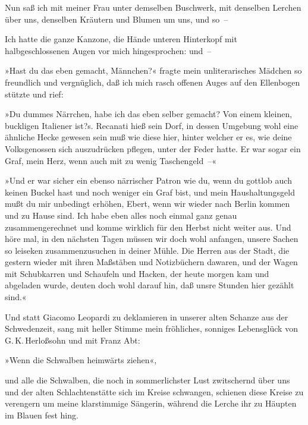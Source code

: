 Nun saß ich mit meiner Frau unter demselben Buschwerk, mit
denselben Lerchen über uns, denselben Kräutern und Blumen um uns,
und so~–

Ich hatte die ganze Kanzone, die Hände unteren Hinterkopf mit
halbgeschlossenen Augen vor mich hingesprochen: und~–

»Hast du das eben gemacht, Männchen?« fragte mein unliterarisches
Mädchen so freundlich und vergnüglich, daß ich mich rasch offenen
Auges auf den Ellenbogen stützte und rief:

»Du dummes Närrchen, habe ich das eben selber gemacht? Von einem
kleinen, buckligen Italiener ist?s. Recanati hieß sein Dorf, in
dessen Umgebung wohl eine ähnliche Hecke gewesen sein muß wie diese
hier, hinter welcher er es, wie deine Volksgenossen sich
auszudrücken pflegen, unter der Feder hatte. Er war sogar ein Graf,
mein Herz, wenn auch mit zu wenig Taschengeld~–«

»Und er war sicher ein ebenso närrischer Patron wie du, wenn du
gottlob auch keinen Buckel hast und noch weniger ein Graf bist, und
mein Haushaltungsgeld mußt du mir unbedingt erhöhen, Ebert, wenn
wir wieder nach Berlin kommen und zu Hause sind. Ich habe eben
alles noch einmal ganz genau zusammengerechnet und komme wirklich
für den Herbst nicht weiter aus. Und höre mal, in den nächsten
Tagen müssen wir doch wohl anfangen, unsere Sachen so leiseken
zusammenzusuchen in deiner Mühle. Die Herren aus der Stadt, die
gestern wieder mit ihren Maßstäben und Notizbüchern dawaren, und
der Wagen mit Schubkarren und Schaufeln und Hacken, der heute
morgen kam und abgeladen wurde, deuten doch wohl darauf hin, daß
unsre Stunden hier gezählt sind.«

Und statt Giacomo Leopardi zu deklamieren in unserer alten Schanze
aus der Schwedenzeit, sang mit heller Stimme mein fröhliches,
sonniges Lebensglück von G.\,K.\,Herloßsohn und mit Franz Abt:

\begin{center}
»Wenn die Schwalben heimwärts ziehen«,
\end{center}
\noindent
und alle die
Schwalben, die noch in sommerlichster Lust zwitschernd über uns und
der alten Schlachtenstätte sich im Kreise schwangen, schienen diese
Kreise zu verengern um meine klarstimmige Sängerin, während die
Lerche ihr zu Häupten im Blauen fest hing.

